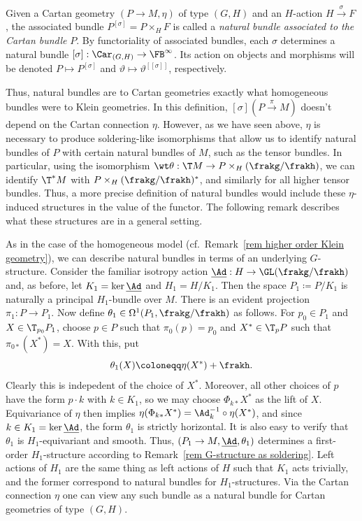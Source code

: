 \begin{defn}
    Given a Cartan geometry $(P\to M,\eta)$ of type $(G,H)$ and an $H$-action $H\overset{\sigma}{\to}F$, the associated bundle $P^{[\sigma]}=P\times_H F$ is called a \emph{natural bundle associated to the Cartan bundle} $P$. By functoriality of associated bundles, each $\sigma$ determines a natural bundle $[\sigma]:\Car_{(G,H)}\to \FB^\infty$. Its action on objects and morphisms will be denoted $P\mapsto P^{[\sigma]}$ and $\vartheta\mapsto \vartheta^[{[\sigma]}]$, respectively.
\end{defn}

Thus, natural bundles are to Cartan geometries exactly what homogeneous bundles were to Klein geometries. In this definition, $[\sigma](P\overset{\pi}{\to} M)$ doesn't depend on the Cartan connection $\eta$. However, as we have seen above, $\eta$ is necessary to produce soldering-like isomorphisms that allow us to identify natural bundles of $P$ with certain natural bundles of $M$, such as the tensor bundles. In particular, using the isomorphism $\wt\theta:\T M\to P\times_H(\frakg\slash\frakh)$, we can identify $\T^\ast M$ with $P\times_H(\frakg\slash\frakh)^\ast$, and similarly for all higher tensor bundles. Thus, a more precise definition of natural bundles would include these $\eta$-induced structures in the value of the functor. The following remark describes what these structures are in a general setting.

\begin{rem}
    As in the case of the homogeneous model (cf.\ Remark~\ref{rem higher order Klein geometry}), we can describe natural bundles in terms of an underlying $G$-structure. Consider the familiar isotropy action $\underline{\Ad}:H\to \GL(\frakg\slash\frakh)$ and, as before, let $K_1=\ker \underline{\Ad}$ and $H_1=H\slash K_1$. Then the space $P_1\coloneqq P\slash K_1$ is naturally a principal $H_1$-bundle over $M$. There is an evident projection $\pi_1:P\to P_1$. Now define $\theta_1\in\Omega^1(P_1,\frakg\slash\frakh)$ as follows. For $p_0\in P_1$ and $X\in \T_{p_0}P_1$, choose $p\in P$ such that $\pi_0(p)=p_0$ and $X^\ast\in \T_p P$ such that $\pi_{0\ast}(X^\ast)=X$. With this, put 
    \[\theta_1(X)\coloneqq \eta(X^\ast)+\frakh.\]
    Clearly this is indepedent of the choice of $X^\ast$. Moreover, all other choices of $p$ have the form $p\cdot k$ with $k\in K_1$, so we may choose $\Phi_{k\ast}X^\ast$ as the lift of $X$. Equivariance of $\eta$ then implies $\eta(\Phi_{k\ast }X^\ast)=\Ad_k^{-1}\circ \eta(X^\ast)$, and since $k\in K_1=\ker \underline{\Ad}$, the form $\theta_1$ is strictly horizontal. It is also easy to verify that $\theta_1$ is $H_1$-equivariant and smooth. Thus, $(P_1\to M,\underline{\Ad},\theta_1)$ determines a first-order $H_1$-structure according to Remark~\ref{rem G-structure as soldering}. Left actions of $H_1$ are the same thing as left actions of $H$ such that $K_1$ acts trivially, and the former correspond to natural bundles for $H_1$-structures. Via the Cartan connection $\eta$ one can view any such bundle as a natural bundle for Cartan geometries of type $(G,H)$.
\end{rem}

